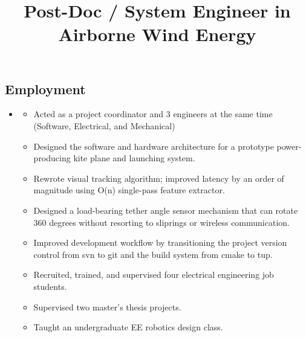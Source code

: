 \documentclass[line,lm,rm,11pt]{res} %
\def\spaceline{\vspace{1mm} \fullline}
\begin{document}
\begin{resume}
\section{Employment}
\begin{itemize}
\item
	\spaceline
	\title{\bf Post-Doc / System Engineer in Airborne Wind Energy }
	\begin{position}
	\vspace{-2mm}
	\begin{itemize}
		\item Acted as a project coordinator and 3 engineers at the same time (Software, Electrical, and Mechanical)
		\item Designed the software and hardware architecture for a prototype power-producing kite plane and launching system.
		\item Rewrote visual tracking algorithm; improved latency by an order of magnitude using O(n) single-pass feature extractor.
		\item Designed a load-bearing tether angle sensor mechanism that can rotate 360 degrees without resorting to sliprings or wireless communication.
		\item Improved development workflow by transitioning the project version control from svn to git and the build system from cmake to tup.
		\item Recruited, trained, and supervised four electrical engineering job students.
		\item Supervised two master's thesis projects.
		\item Taught an undergraduate EE robotics design class.


\end{itemize}
\end{position}
\end{itemize}
\end{resume}
\end{document}
